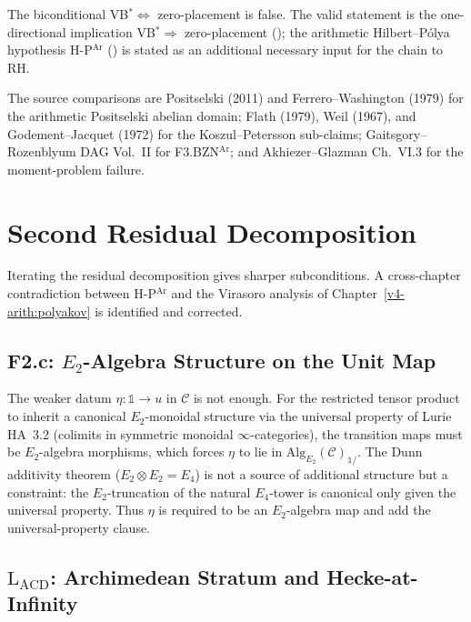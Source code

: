 The biconditional VB\(^{*}\Leftrightarrow\) zero-placement is false.
The valid statement is the one-directional implication
VB\(^{*}\Rightarrow\) zero-placement
();
the arithmetic Hilbert--P\'olya hypothesis H-P\(^{\mathrm{Ar}}\)
() is stated as an additional
necessary input for the chain to RH.

The source comparisons are Positselski (2011)
and Ferrero--Washington (1979) for the arithmetic Positselski abelian
domain; Flath (1979), Weil (1967), and Godement--Jacquet (1972) for
the Koszul--Petersson sub-claims; Gaitsgory--Rozenblyum DAG Vol.~II
for F3.BZN\(^{\mathrm{Ar}}\); and Akhiezer--Glazman Ch.~VI.3 for the
moment-problem failure.

\section{Second Residual Decomposition}
\label{v4-arith:sw:wave2}

Iterating the residual decomposition gives sharper subconditions.
A cross-chapter contradiction between H-P\(^{\mathrm{Ar}}\) and the
Virasoro analysis of Chapter~\ref{v4-arith:polyakov} is identified
and corrected.

\subsection{F2.c: \texorpdfstring{\(E_{2}\)}{E2}-Algebra Structure on the Unit Map}

The weaker datum \(\eta:\mathbb{1}\to u\) in \(\mathcal{C}\) is not
enough. For the restricted tensor product to inherit a canonical
\(E_{2}\)-monoidal structure via the universal property of Lurie
HA~3.2 (colimits in symmetric monoidal \(\infty\)-categories), the
transition maps must be \(E_{2}\)-algebra morphisms, which forces
\(\eta\) to lie in \(\mathrm{Alg}_{E_{2}}(\mathcal{C})_{\mathbb{1}/}\).
The Dunn additivity theorem (\(E_{2}\otimes E_{2}=E_{4}\)) is not a
source of additional structure but a constraint: the \(E_{2}\)-truncation
of the natural \(E_{4}\)-tower is canonical only given the universal
property. Thus \(\eta\) is required to be an
\(E_{2}\)-algebra map and add the universal-property clause.

\subsection{\texorpdfstring{\(\mathrm{L}_{\mathrm{ACD}}\)}{L-ACD}: Archimedean Stratum and Hecke-at-Infinity}

